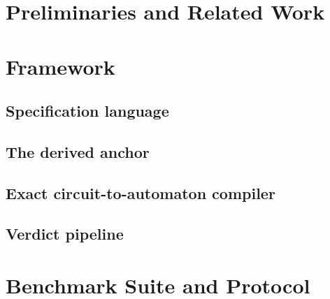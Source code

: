 \documentclass[conference]{IEEEtran}
\begin{document}
\section{Preliminaries and Related Work}
\label{sec:related}

\section{Framework}
\label{sec:framework}
\subsection{Specification language}

\subsection{The derived anchor}
\label{sec:anchor}

\subsection{Exact circuit-to-automaton compiler}

\subsection{Verdict pipeline}

\section{Benchmark Suite and Protocol}
\label{sec:benchmark}
\end{document}
